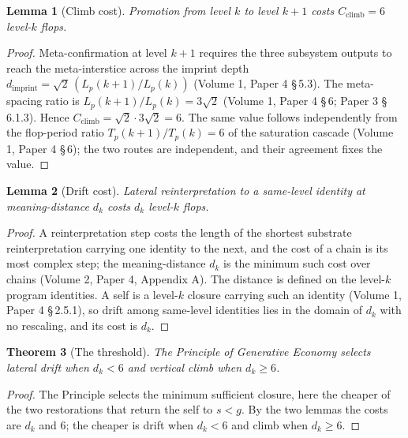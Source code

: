 \documentclass[11pt,oneside]{report}
\newtheorem{theorem}{Theorem}[section]
\newtheorem{lemma}[theorem]{Lemma}
\theoremstyle{definition}
\theoremstyle{remark}
\begin{document}
\begin{lemma}[Climb cost]
Promotion from level \ensuremath{k} to level \ensuremath{k+1} costs \ensuremath{C_{\mathrm{climb}} = 6} level-\ensuremath{k} flops.
\end{lemma}

\begin{proof}
Meta-confirmation at level \ensuremath{k+1} requires the three subsystem outputs to reach the meta-interstice across the imprint depth \ensuremath{d_{\mathrm{imprint}} = \sqrt{2}\,(L_p(k{+}1)/L_p(k))} (Volume 1, Paper 4 \S\,5.3). The meta-spacing ratio is \ensuremath{L_p(k{+}1)/L_p(k) = 3\sqrt{2}} (Volume 1, Paper 4 \S\,6; Paper 3 \S\,6.1.3). Hence \ensuremath{C_{\mathrm{climb}} = \sqrt{2}\cdot 3\sqrt{2} = 6}. The same value follows independently from the flop-period ratio \ensuremath{T_p(k{+}1)/T_p(k) = 6} of the saturation cascade (Volume 1, Paper 4 \S\,6); the two routes are independent, and their agreement fixes the value.
\end{proof}

\begin{lemma}[Drift cost]
Lateral reinterpretation to a same-level identity at meaning-distance \ensuremath{d_k} costs \ensuremath{d_k} level-\ensuremath{k} flops.
\end{lemma}

\begin{proof}
A reinterpretation step costs the length of the shortest substrate reinterpretation carrying one identity to the next, and the cost of a chain is its most complex step; the meaning-distance \ensuremath{d_k} is the minimum such cost over chains (Volume 2, Paper 4, Appendix A). The distance is defined on the level-\ensuremath{k} program identities. A self is a level-\ensuremath{k} closure carrying such an identity (Volume 1, Paper 4 \S\,2.5.1), so drift among same-level identities lies in the domain of \ensuremath{d_k} with no rescaling, and its cost is \ensuremath{d_k}.
\end{proof}

\begin{theorem}[The threshold]
The Principle of Generative Economy selects lateral drift when \ensuremath{d_k < 6} and vertical climb when \ensuremath{d_k \ge 6}.
\end{theorem}

\begin{proof}
The Principle selects the minimum sufficient closure, here the cheaper of the two restorations that return the self to \ensuremath{s < g}. By the two lemmas the costs are \ensuremath{d_k} and \ensuremath{6}; the cheaper is drift when \ensuremath{d_k < 6} and climb when \ensuremath{d_k \ge 6}.
\end{proof}
\end{document}

